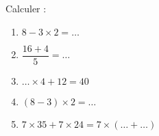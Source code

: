 
\begin{exercice}\label{exosmath-0813}

    Calculer :
    \begin{enumerate}
        \item
            \( 8-3\times 2=\ldots\)
        \item
            \( \dfrac{ 16+4 }{ 5 }=\ldots\)
        \item
            \( \ldots \times 4+12=40\)
        \item
            \( (8-3)\times 2=\ldots\)
        \item
            \( 7\times 35+7\times 24=7\times(\ldots +\ldots)\)
    \end{enumerate}

\end{exercice}
